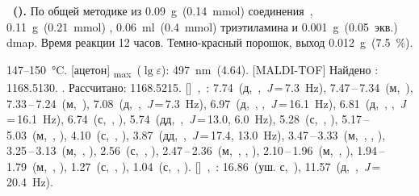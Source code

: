 \textbf{~().} 
По общей методике из \SI{0.09}{\gram}~(\SI{0.14}{\milli\mole}) соединения~, \SI{0.11}{\gram}~(\SI{0.21}{\milli\mole}) , \SI{0.06}{\milli\litre}~(\SI{0.4}{\milli\mole}) триэтиламина и \SI{0.001}{\gram}~(0.05~экв.) \ac{dmap}.
Время реакции 12 часов.
Темно-красный порошок, выход \SI{0.012}{\gram}~(\SI{7.5}{\percent}).
\begin{experimental}
     147--\SI{150}{\celsius}.
    [ацетон] \chemlambda\textsubscript{max}~($\lg \varepsilon$): \SI{497}{\nano\metre}~(4.64).
    [MALDI-TOF] Найдено \ce{[M + H]+}: \num{1168.5130}. . Рассчитано: \ce{[M + H]} \num{1168.5215}.
    []~\chemdelta,~\si{\ppm}: 7.74~(д,~,~\textit{J}\,=\,7.3~\si{\hertz}), 7.47\,--\,7.34~(м,~), 7.33\,--\,7.24~(м,~), 7.08~(д,~,~\textit{J}\,=\,7.3~\si{\hertz}), 6.97~(д,~, ,~\textit{J}\,=\,16.1~\si{\hertz}), 6.81~(д,~, ,~\textit{J}\,=\,16.1~\si{\hertz}), 6.74~(с,~, ), 5.74~(дд,~,~\textit{J}\,=\,13.0, 6.0~\si{\hertz}), 5.28~(с,~, ), 5.17\,--\,5.03~(м,~, ), 4.10~(с,~, ), 3.87~(дд,~,~\textit{J}\,=\,17.4, 13.0~\si{\hertz}), 3.47\,--\,3.33~(м,~, , ), 3.25\,--\,3.13~(м,~, ), 2.56~(с,~, ), 2.47\,--\,2.36~(м,~, , ), 2.10\,--\,1.96~(м,~, ), 1.94\,--\,1.79~(м,~, ), 1.27~(с,~, ), 1.04~(с,~, ).
    []~\chemdelta,~\si{\ppm}: 16.86~(уш. с,~), 11.57~(д,~,~\textit{J}\,=\,20.4~\si{\hertz}).
\end{experimental}
